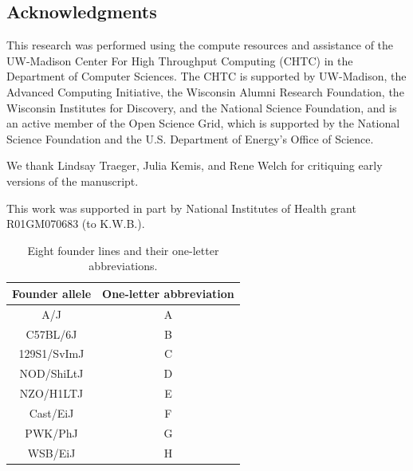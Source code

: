 \documentclass[12pt,twoside, lineno]{gsajnl}
\begin{document}
\subsection*{Acknowledgments}

This research was performed using the compute resources and assistance
of the UW-Madison Center For High Throughput Computing (CHTC) in the
Department of Computer Sciences. The CHTC is supported by UW-Madison,
the Advanced Computing Initiative, the Wisconsin Alumni Research
Foundation, the Wisconsin Institutes for Discovery, and the National
Science Foundation, and is an active member of the Open Science Grid,
which is supported by the National Science Foundation and the U.S.
Department of Energy's Office of Science.

We thank Lindsay Traeger, Julia Kemis, and Rene Welch for critiquing
early versions of the manuscript.

This work was supported in part by National Institutes of Health grant
R01GM070683 (to K.W.B.). 

\newpage
\appendix

\renewcommand{\thetable}{\textbf{S\arabic{table}}}
\setcounter{table}{0}


\begin{table}[hb]
  \caption{Eight founder lines and their one-letter abbreviations.}
  \label{table-letters}
\begin{center}
\small
  \begin{tabular}{ c | c }
    \hline
    Founder allele & One-letter abbreviation \\ \hline
    A/J & A \\
    C57BL/6J & B \\
    129S1/SvImJ & C \\
    NOD/ShiLtJ & D\\
    NZO/H1LTJ & E\\
    Cast/EiJ & F\\
    PWK/PhJ & G\\
    WSB/EiJ & H\\
    \hline
  \end{tabular}

\end{center}
  \end{table}

\clearpage
\end{document}
